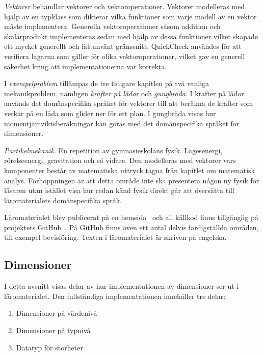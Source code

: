 \textit{Vektorer} behandlar vektorer och vektoroperationer. Vektorer modelleras
med hjälp av en typklass som dikterar vilka funktioner som varje
modell av en vektor måste implementera. Generella vektoroperationer såsom
addition och skalärprodukt implementeras sedan med hjälp av dessa funktioner
vilket skapade ett mycket generellt och lättanvänt gränssnitt. QuickCheck
användes för att verifiera lagarna som gäller för olika vektoroperationer,
vilket gav en generell säkerhet kring att implementationerna var korrekta.

I \textit{exempelproblem} tillämpas de tre tidigare kapitlen på två vanliga
mekanikproblem, nämligen \textit{krafter på lådor} och \textit{gungbräda}. I
krafter på lådor används det domänspecifika språket för vektorer till att
beräkna de krafter som verkar på en låda som glider ner för ett plan. I
gungbräda visas hur momentjämviktsberäkningar kan göras med det domänspecifika
språket för dimensioner.

\textit{Partikelmekanik}. En repetition av gymnasieskolans fysik.
Lägesenergi, rörelseenergi, gravitation och så vidare. Den modelleras med vektorer vars
komponenter består av matematiska uttryck tagna från kapitlet om matematisk
analys. Förhoppningen är att detta område inte ska presentera någon ny fysik för
läsaren utan istället visa hur redan känd fysik direkt går att översätta till
läromaterialets domänspecifika språk.

Läromaterialet blev publicerat på en hemsida~\cite{LYAP} och all källkod finns
tillgänglig på projektets GitHub~\cite{LYAP_repo}. På GitHub finns även ett
antal delvis färdigställda områden, till exempel bevisföring. Texten i
läromaterialet är skriven på engelska.

\subsection{Dimensioner}
\label{sec:grund_impl}
\label{sec:res_dim}

I detta avsnitt visas delar av hur implementationen av dimensioner ser ut i
läromaterialet. Den fullständiga implementationen innehåller tre delar:

\begin{enumerate}
  \item Dimensioner på värdenivå
  \item Dimensioner på typnivå
  \item Datatyp för storheter
\end{enumerate}

